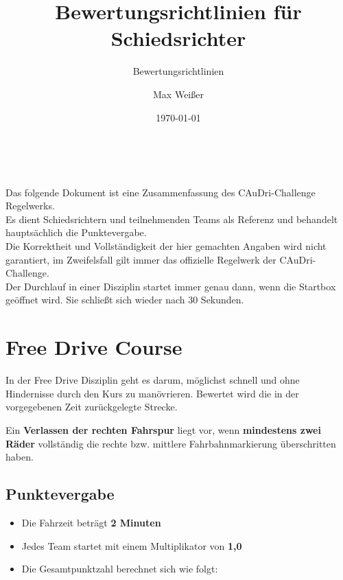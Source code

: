 \documentclass[a4paper, 11pt,usegeometry]{scrartcl}
\title{Bewertungsrichtlinien für Schiedsrichter}
\subtitle{Bewertungsrichtlinien}
\author{Max Weißer}
\date{\today}
\begin{document}
\begin{center}
	{\LARGE\bfseries\Title\\}		%
	\vspace{0.5\baselineskip}		
\end{center}

Das folgende Dokument ist eine Zusammenfassung des CAuDri-Challenge Regelwerks.\\ 
Es dient Schiedsrichtern und teilnehmenden Teams als Referenz und behandelt hauptsächlich die Punktevergabe.\\
Die Korrektheit und Vollständigkeit der hier gemachten Angaben wird nicht garantiert, im Zweifelsfall gilt immer das offizielle Regelwerk der CAuDri-Challenge.\\
Der Durchlauf in einer Disziplin startet immer genau dann, wenn die Startbox geöffnet wird.
Sie schließt sich wieder nach 30 Sekunden.

\section*{Free Drive Course}
In der Free Drive Disziplin geht es darum, möglichst schnell und ohne Hindernisse durch den Kurs
zu manövrieren. Bewertet wird die in der vorgegebenen Zeit zurückgelegte Strecke.

Ein \textbf{Verlassen der rechten Fahrspur} liegt vor, wenn \textbf{mindestens zwei Räder} vollständig die rechte bzw. mittlere Fahrbahnmarkierung überschritten haben.

\subsection*{Punktevergabe}
\begin{itemize}
  \item Die Fahrzeit beträgt \textbf{2 Minuten}
  \item Jedes Team startet mit einem Multiplikator von \textbf{1,0}
  \item Die Gesamtpunktzahl berechnet sich wie folgt:\\
  
\end{itemize}
\end{document}

